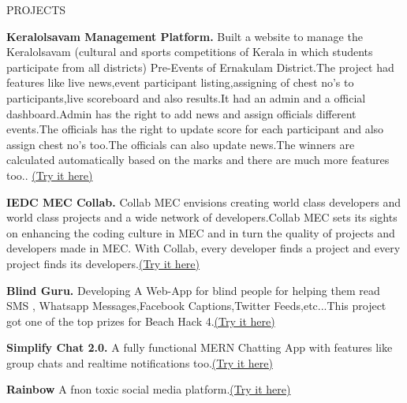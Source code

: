 \documentclass{resume} %
\begin{document}
	\begin{rSection}{PROJECTS}
		\vspace{-1.25em}
		\item \textbf{Keralolsavam Management Platform.} {Built a website to manage the Keralolsavam (cultural and sports competitions of Kerala in which students participate from all districts) Pre-Events of Ernakulam District.The project had features like live news,event participant listing,assigning of chest no's to participants,live scoreboard and also results.It had an admin and a official dashboard.Admin has the right to add news and assign officials different events.The officials has the right to update score for each participant and also assign chest no's too.The officials can also update news.The winners are calculated automatically based on the marks and there are much more features too.. \href{https://keralolsavam.vercel.app/}{(Try it here)}}
		\item \textbf{IEDC MEC Collab.} {Collab MEC envisions creating world class developers and world class projects and a wide network of developers.Collab MEC sets its sights on enhancing the coding culture in MEC and in turn the quality of projects and developers made in MEC. With Collab, every developer finds a project and every project finds its developers.\href{https://collab.iedcmec.in/}{(Try it here)}}
		\item \textbf{Blind Guru.} {Developing A Web-App for blind people for helping them read SMS , Whatsapp
			Messages,Facebook Captions,Twitter Feeds,etc...This project got one of the top prizes for Beach Hack 4.\href{https://blind-guru.netlify.app/}{(Try it here)}}
			\item \textbf{Simplify Chat 2.0.} {A fully functional MERN Chatting App with features like group chats and realtime notifications too.\href{https://simplify-chat.herokuapp.com/}{(Try it here)}}
			\item \textbf{Rainbow} {A fnon toxic social media platform.\href{https://rainbow-emerald.netlify.app/}{(Try it here)}}
	\end{rSection} 
	
\end{document}
